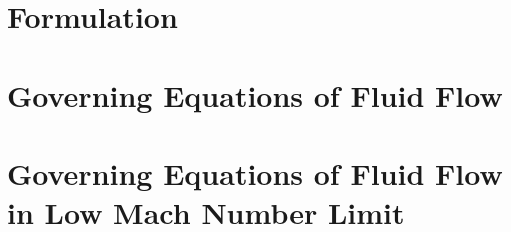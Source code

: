 \documentclass[pdftex,12pt,a4paper,oneside]{report}
\begin{document}
\chapter{Formulation}



\begin{appendices}


\chapter{Governing Equations of Fluid Flow}

\chapter{Governing Equations of Fluid Flow in Low Mach Number Limit}



\end{appendices}
\end{document}
